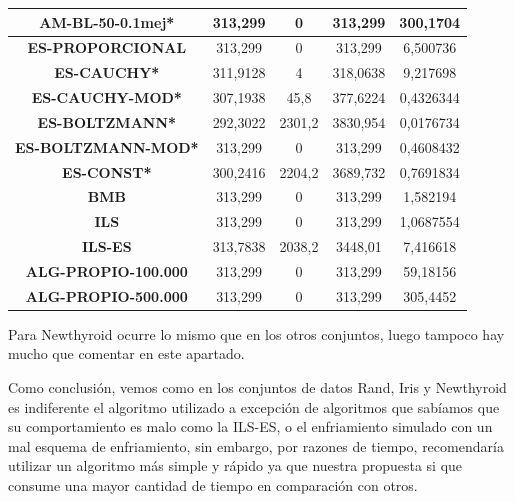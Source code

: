 \documentclass[12pt, spanish]{article}
\begin{document}
\begin{table}[H]
\begin{tabular}{|c|c|c|c|c|}
\textbf{AM-BL-50-0.1mej*}   & 313,299                   & 0                           & 313,299                & 300,1704   \\ \hline
\textbf{ES-PROPORCIONAL}    & 313,299                   & 0                           & 313,299                & 6,500736   \\ \hline
\textbf{ES-CAUCHY*}         & 311,9128                  & 4                           & 318,0638               & 9,217698   \\ \hline
\textbf{ES-CAUCHY-MOD*}     & 307,1938                  & 45,8                        & 377,6224               & 0,4326344  \\ \hline
\textbf{ES-BOLTZMANN*}      & 292,3022                  & 2301,2                      & 3830,954               & 0,0176734  \\ \hline
\textbf{ES-BOLTZMANN-MOD*}  & 313,299                   & 0                           & 313,299                & 0,4608432  \\ \hline
\textbf{ES-CONST*}          & 300,2416                  & 2204,2                      & 3689,732               & 0,7691834  \\ \hline
\textbf{BMB}                & 313,299                   & 0                           & 313,299                & 1,582194   \\ \hline
\textbf{ILS}                & 313,299                   & 0                           & 313,299                & 1,0687554  \\ \hline
\textbf{ILS-ES}             & 313,7838                  & 2038,2                      & 3448,01                & 7,416618   \\ \hline
\textbf{ALG-PROPIO-100.000} & 313,299                   & 0                           & 313,299                & 59,18156   \\ \hline
\textbf{ALG-PROPIO-500.000} & 313,299                   & 0                           & 313,299                & 305,4452   \\ \hline
\end{tabular}
\end{table}

Para Newthyroid ocurre lo mismo que en los otros conjuntos, luego tampoco hay mucho que comentar en este apartado.


Como conclusión, vemos como en los conjuntos de datos Rand, Iris y Newthyroid es indiferente el algoritmo utilizado a excepción de algoritmos que sabíamos que su comportamiento es malo como la ILS-ES, o el enfriamiento simulado con un mal esquema de enfriamiento, sin embargo, por razones de tiempo, recomendaría utilizar un algoritmo más simple y rápido ya que nuestra propuesta si que consume una mayor cantidad de tiempo en comparación con otros.
\end{document}
